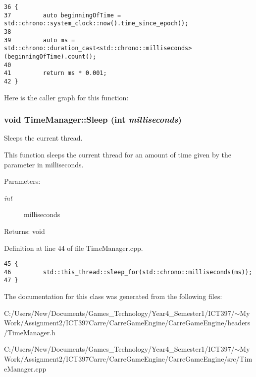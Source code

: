\begin{Code}\begin{verbatim}36 {
37         auto beginningOfTime = std::chrono::system_clock::now().time_since_epoch();
38 
39         auto ms = std::chrono::duration_cast<std::chrono::milliseconds>(beginningOfTime).count();
40 
41         return ms * 0.001;
42 }
\end{verbatim}
\end{Code}




Here is the caller graph for this function:\hypertarget{class_time_manager_a2273e7e9e31462ae81b2331fe8e7ac6}{
\subsubsection[Sleep]{\setlength{\rightskip}{0pt plus 5cm}void TimeManager::Sleep (int {\em milliseconds})}}
\label{class_time_manager_a2273e7e9e31462ae81b2331fe8e7ac6}


Sleeps the current thread. 

This function sleeps the current thread for an amount of time given by the parameter in milliseconds.

\begin{Desc}
\item[Parameters:]
\begin{description}
\item[{\em int}]milliseconds \end{description}
\end{Desc}
\begin{Desc}
\item[Returns:]void \end{Desc}


Definition at line 44 of file TimeManager.cpp.

\begin{Code}\begin{verbatim}45 {
46         std::this_thread::sleep_for(std::chrono::milliseconds(ms));
47 }\end{verbatim}
\end{Code}




The documentation for this class was generated from the following files:\begin{CompactItemize}
\item 
C:/Users/New/Documents/Games\_\-Technology/Year4\_\-Semester1/ICT397/$\sim$My Work/Assignment2/ICT397Carre/CarreGameEngine/CarreGameEngine/headers/TimeManager.h\item 
C:/Users/New/Documents/Games\_\-Technology/Year4\_\-Semester1/ICT397/$\sim$My Work/Assignment2/ICT397Carre/CarreGameEngine/CarreGameEngine/src/TimeManager.cpp\end{CompactItemize}
